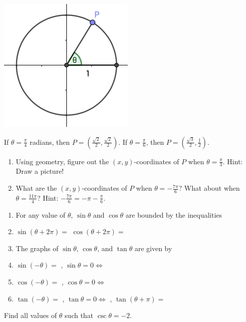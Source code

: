 \documentclass[12pt, a4paper]{article}
\begin{document}
\begin{minipage}{0.2\linewidth}
  \includegraphics[scale=0.5]{images/unit-circle}
\end{minipage}
\begin{ex}
  If \(\theta = \frac{\pi}{4}\) radians, then \(P = \left(\frac{\sqrt{2}}{2},
  \frac{\sqrt{2}}{2}\right)\). If \(\theta = \frac{\pi}{6}\), then \(P =
  \left(\frac{\sqrt{3}}{2}, \frac{1}{2}\right)\).
  \begin{enumerate}
  \item Using geometry, figure out the \((x,y)\)-coordinates of \(P\)
    when \(\theta = \frac{\pi}{3}\). Hint: Draw a picture!
  \vspace{1in}
  \item What are the \((x,y)\)-coordinates of \(P\) when \(\theta =
    -\frac{7\pi}{6}\)? What about when \(\theta = \frac{11 \pi}{4}\)?
    Hint: \(-\frac{7\pi}{6} = -\pi-\frac{\pi}{6}\). 
  \vspace{0.8in}
  \end{enumerate}
\end{ex}
\vspace{-1.5in}
\begin{thrm}
  \begin{enumerate}
  \item For any value of \(\theta\), \(\sin \theta\) and \(\cos
    \theta\) are bounded by the inequalities
    \vspace{0.5in}
  \item \(\sin(\theta + 2\pi) = \) \hspace{1in} \(\cos(\theta+2\pi)=\)
  \item The graphs of \(\sin \theta\), \(\cos \theta\), and \(\tan
    \theta\) are given by
    \vspace{1.5in}
  \item \(\sin (-\theta) = \) \hspace{1in}, \(\sin \theta = 0 \iff \)
  \item \(\cos (-\theta) = \) \hspace{1in}, \(\cos \theta = 0 \iff \)
  \item \(\tan(-\theta) = \) \hspace{1in}, \(\tan \theta = 0 \iff \)
    \hspace{1in}, \(\tan(\theta + \pi) = \) 
  \end{enumerate}
\end{thrm}
\begin{ex}
  Find all values of \(\theta\) such that \(\csc \theta = -2\).
\end{ex}
\end{document}
